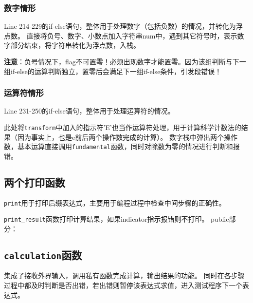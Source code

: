 \documentclass[UTF8]{ctexart}
\begin{document}
\subsubsection{数字情形}
Line 214-229的if-else语句，整体用于处理数字（包括负数）的情况，并转化为浮点数。
直接将负号、数字、小数点加入字符串num中，遇到其它符号时，表示数字部分结束，将字符串转化为浮点数，入栈。

\textbf{注意}：负号情况下，flag不可置零！必须出现数字才能置零。因为该组判断与下一组if-else的运算判断独立，置零后会满足下一组if-else条件，引发段错误！
\subsubsection{运算符情形}
Line 231-250的if-else语句，整体用于处理运算符的情况。

此处将\texttt{transform}中加入的指示符'E'也当作运算符处理，用于计算科学计数法的结果（因为事实上，也是e前后两个操作数完成的计算）。
数字栈中弹出两个操作数，基本运算直接调用\texttt{fundamental}函数，同时对除数为零的情况进行判断和报错。

\subsection{两个打印函数}
\texttt{print}用于打印后缀表达式，主要用于编程过程中检查中间步骤的正确性。 

\texttt{print\_result}函数打印计算结果，如果indicator指示报错则不打印。
\clearpage
public部分：
\subsection{\texttt{calculation}函数}
集成了接收外界输入，调用私有函数完成计算，输出结果的功能。
同时在各步骤过程中都及时判断是否出错，若出错则暂停该表达式求值，进入测试程序下一个表达式。
\end{document}
